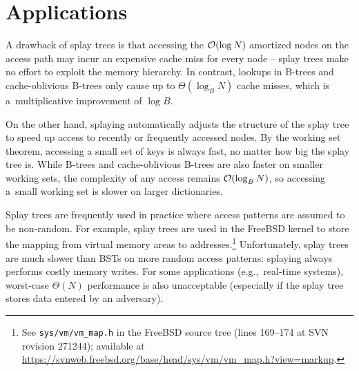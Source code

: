 \section{Applications}
A drawback of splay trees is that accessing the $\mathcal{O}(\log N)$ amortized
nodes on the access path may incur an expensive cache miss for every node --
splay trees make no effort to exploit the memory hierarchy.
In contrast, lookups in B-trees and cache-oblivious B-trees
only cause up to $\Theta(\log_B N)$ cache misses, which is a~multiplicative
improvement of $\log B$.

On the other hand, splaying automatically adjusts the structure of the splay
tree to speed up access to recently or frequently accessed nodes. By the
working set theorem, accessing a small set of keys is always fast, no matter
how big the splay tree is. While B-trees and cache-oblivious B-trees are
also faster on smaller working sets, the complexity of any access remains
$\mathcal{O}(\log_B N)$, so accessing a~small working set is slower on larger
dictionaries.

Splay trees are frequently used in practice where access patterns are assumed
to be non-random. For example, splay trees are used in the FreeBSD kernel
to store the mapping from virtual memory areas to
addresses.\footnote{%
	See \texttt{sys/vm/vm\_map.h} in the FreeBSD source tree (lines 169--174
	at SVN revision 271244); available at
	\url{https://svnweb.freebsd.org/base/head/sys/vm/vm\_map.h?view=markup}.
}
Unfortunately, splay trees are much slower than BSTs on more random
access patterns: splaying always performs costly memory writes.
For some applications (e.g.,\ real-time systems), worst-case $\Theta(N)$
performance is also unacceptable (especially if the splay tree stores data
entered by an adversary).
